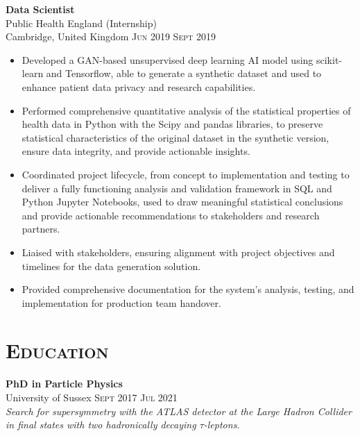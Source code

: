 \documentclass[oneside]{article}
\newcommand{\empitem}[7]{
        {\large \textbf{#1}} \\
        {{\fontseries{medium}\selectfont #2}}\\
        {{\fontseries{light}\selectfont #3}} \hfill
        {\scshape\fontseries{light}\selectfont\footnotesize #4 \textendash{} #5 #6} 
        #7
}
\begin{document}
{\begin{minipage}[t][\dimexpr\textheight-2\fboxrule-2\fboxsep\relax][t]{\dimexpr0.6\textwidth-2\fboxrule-2\fboxsep\relax}
        \empitem{Data Scientist}
        {Public Health England (Internship)}
        {Cambridge, United Kingdom}
        {Jun 2019}
        {Sept 2019}
        {}
        {
        \begin{itemize}
            \setlength{\itemsep}{-3pt}
            \item Developed a GAN-based unsupervised deep learning AI model using scikit-learn and Tensorflow, able to generate a synthetic dataset and used to enhance patient data privacy and research capabilities.
            \item Performed comprehensive quantitative analysis of the statistical properties of health data in Python with the Scipy and pandas libraries, to preserve statistical characteristics of the original dataset in the synthetic version, ensure data integrity, and provide actionable insights.
            \item Coordinated project lifecycle, from concept to implementation and testing to deliver a fully functioning analysis and validation framework in SQL and Python Jupyter Notebooks, used to draw meaningful statistical conclusions and provide actionable recommendations to stakeholders and research partners.
            \item Liaised with stakeholders, ensuring alignment with project objectives and timelines for the data generation solution.
            \item Provided comprehensive documentation for the system’s analysis, testing, and implementation for production team handover.
        \end{itemize}
        }
        
        \section*{\scshape\Large Education \hrulefill}
%
        {\large \textbf{PhD in Particle Physics}} \\ {University of Sussex}\hfill
        {\scshape{}\selectfont\footnotesize Sept 2017 \textendash{} Jul 2021} \\
        {\textit{Search for supersymmetry with the ATLAS detector at the Large Hadron Collider in final states with two hadronically decaying $\tau$-leptons.}} \\
        

\end{minipage}}
\end{document}
